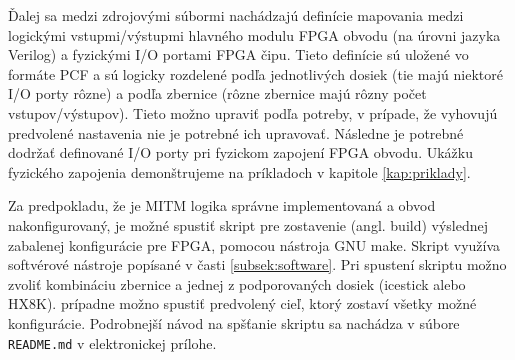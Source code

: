 Ďalej sa medzi zdrojovými súbormi nachádzajú definície mapovania medzi logickými vstupmi/výstupmi hlavného modulu FPGA obvodu (na úrovni jazyka Verilog) a fyzickými I/O portami FPGA čipu. Tieto definície sú uložené vo formáte PCF a sú logicky rozdelené podľa jednotlivých dosiek (tie majú niektoré I/O porty rôzne) a podľa zbernice (rôzne zbernice majú rôzny počet vstupov/výstupov). Tieto možno upraviť podľa potreby, v prípade, že vyhovujú predvolené nastavenia nie je potrebné ich upravovať. Následne je potrebné dodržať definované I/O porty pri fyzickom zapojení FPGA obvodu. Ukážku fyzického zapojenia demonštrujeme na príkladoch v kapitole \ref{kap:priklady}. 

Za predpokladu, že je MITM logika správne implementovaná a obvod nakonfigurovaný, je možné spustiť skript pre zostavenie (angl. build) výslednej zabalenej konfigurácie pre FPGA, pomocou nástroja GNU make. Skript využíva softvérové nástroje popísané v časti \ref{subsek:software}. Pri spustení skriptu možno zvoliť kombináciu zbernice a jednej z podporovaných dosiek (icestick alebo HX8K). prípadne možno spustiť predvolený cieľ, ktorý zostaví všetky možné konfigurácie. Podrobnejší návod na spšťanie skriptu sa nachádza v súbore \texttt{README.md} v elektronickej prílohe.